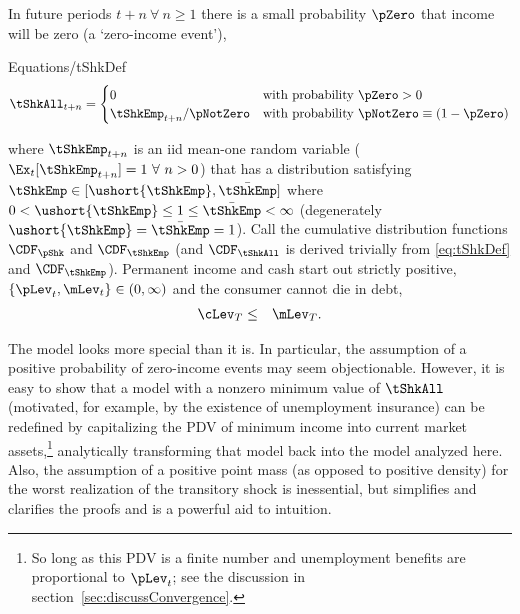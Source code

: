 \documentclass[titlepage]{\econtex}\providecommand{\texname}{BufferStockTheory}%
\providecommand{\EqDir}{Equations}
\begin{document}
In future periods $t+n ~\forall~ n \geq 1$ there is a small probability $\pZero$ that income will
be zero (a `zero-income event'),
\begin{verbatimwrite}{\EqDir/tShkDef}
\begin{equation}
\tShkAll _{t+n}=
\begin{cases}
 0\phantom{_{t+1}/\pNotZero} & \text{with probability $\pZero>0$} \\
 \tShkEmp_{t+n}/\pNotZero      & \text{with probability $\pNotZero \equiv (1-\pZero) $}
\end{cases} \label{eq:tShkDef}
\end{equation}
\end{verbatimwrite}

where $\tShkEmp_{t+n}$ is an iid mean-one random variable
($\Ex_{t}[{\tShkEmp}_{t+n}]=1~\forall~n>0$)
that has a distribution
satisfying $\tShkEmp \in \lbrack \ushort{\tShkEmp},\bar{\tShkEmp}\rbrack$
where $0<\ushort{\tShkEmp} \leq 1 \leq \bar{\tShkEmp}<\infty$
(degenerately $\ushort{\tShkEmp}=\bar{\tShkEmp}=1$). Call the cumulative
distribution functions $\CDF_{\pShk}$ and $\CDF_{\tShkEmp}$ (and $\CDF_{\tShkAll}$
is derived trivially from \eqref{eq:tShkDef} and $\CDF_{\tShkEmp}$).
Permanent income and cash start out strictly positive, $\{\pLev_{t},\mLev_{t}\} \in
(0,\infty)$ and the consumer cannot die in
debt,
\begin{eqnarray}
  \cLev_{T} & \leq & \mLev_{T} \label{eq:NoDebtAtDeath}.
\end{eqnarray}

The model looks more special than it is.  In particular, the
assumption of a positive probability of zero-income events may seem
objectionable.  However, it is easy to show that a model with a
nonzero minimum value of $\tShkAll$ (motivated, for example, by the
existence of unemployment insurance) can be redefined by capitalizing
the PDV of minimum income into current market assets,\footnote{So long
  as this PDV is a finite number and unemployment benefits are
  proportional to $\pLev_{t}$; see the discussion in
  section~\ref{sec:discussConvergence}.}  analytically transforming
that model back into the model analyzed here.  Also, the assumption of
a positive point mass (as opposed to positive density) for the worst
realization of the transitory shock is inessential, but simplifies and
clarifies the proofs and is a powerful aid to intuition.

\begin{comment}
Combining the transition equations, the recursive nature of
the problem allows us to rewrite it more compactly in Bellman equation form,
\begin{eqnarray*}
\VFunc_{t}(\mLev_{t},\pLev_{t}) & = & \max_{\cLev_{t}}~\left\{\util(\cLev_{t})+\Discount \Ex_{t}\left[ \VFunc_{t+1}((\mLev_{t}-\cLev_{t})\Rfree+ \pLev_{t+1}\tShkAll_{t+1},\pLev_{t} \PGro  \pShk_{t+1})\right]\right\}
.
\end{eqnarray*}
\end{comment}
\end{document}

